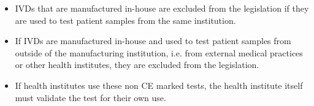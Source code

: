 \begin{itemize}
    \item IVDs that are manufactured in-house are excluded from the legislation if they are used to test patient samples from the same institution.
    \item If IVDs are manufactured in-house and used to test patient samples from outside of the manufacturing institution, i.e. from external medical practices or other health institutes, they are excluded from the legislation.
    \item If health institutes use these non CE marked tests, the health institute itself must validate the test for their own use.
\end{itemize}